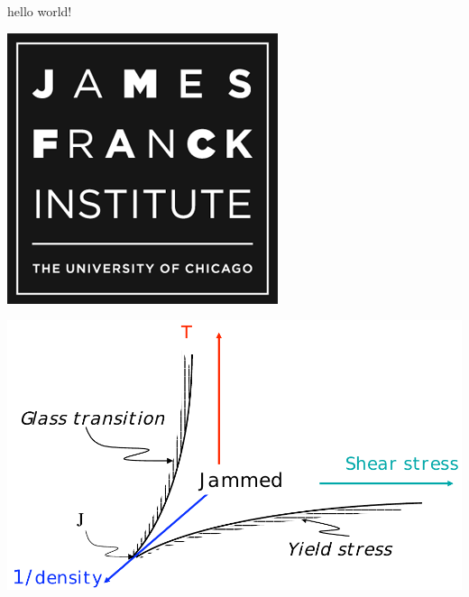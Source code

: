 \documentclass{article}
\begin{document}
hello world! 

\includegraphics[width=1.1\linewidth]{figures/jfi_logo}

\includegraphics[width=\linewidth]{figures/jpd}
\end{document}
